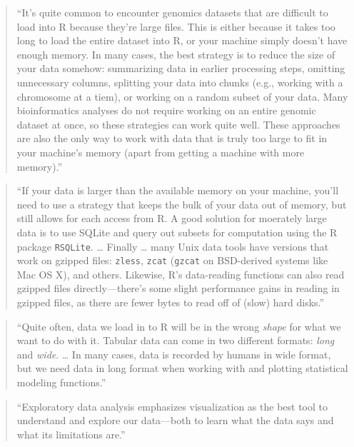\documentclass[]{tufte-book}
\begin{document}
\begin{quote}
``It's quite common to encounter genomics datasets that are difficult to load into
R because they're large files. This is either because it takes too long to load the
entire dataset into R, or your machine simply doesn't have enough memory. In many
cases, the best strategy is to reduce the size of your data somehow: summarizing data
in earlier processing steps, omitting unnecessary columns, splitting your data into
chunks (e.g., working with a chromosome at a tiem), or working on a random subset
of your data. Many bioinformatics analyses do not require working on an entire
genomic dataset at once, so these strategies can work quite well. These approaches
are also the only way to work with data that is truly too large to fit in your
machine's memory (apart from getting a machine with more memory).'' \citep{buffalo2015bioinformatics}
\end{quote}

\begin{quote}
``If your data is larger than the available memory on your machine, you'll need to
use a strategy that keeps the bulk of your data out of memory, but still allows for
each access from R. A good solution for moerately large data is to use SQLite and
query out subsets for computation using the R package \texttt{RSQLite}. \ldots{} Finally \ldots{}
many Unix data tools have versions that work on gzipped files: \texttt{zless}, \texttt{zcat} (\texttt{gzcat}
on BSD-derived systems like Mac OS X), and others. Likewise, R's data-reading
functions can also read gzipped files directly---there's some slight performance
gains in reading in gzipped files, as there are fewer bytes to read off of
(slow) hard disks.'' \citep{buffalo2015bioinformatics}
\end{quote}

\begin{quote}
``Quite often, data we load in to R will be in the wrong \emph{shape} for what we want to
do with it. Tabular data can come in two different formats: \emph{long} and \emph{wide}. \ldots{}
In many cases, data is recorded by humans in wide format, but we need data in long
format when working with and plotting statistical modeling functions.''
\citep{buffalo2015bioinformatics}
\end{quote}

\begin{quote}
``Exploratory data analysis emphasizes visualization as the best tool to understand
and explore our data---both to learn what the data says and what its limitations are.''
\citep{buffalo2015bioinformatics}
\end{quote}
\end{document}
